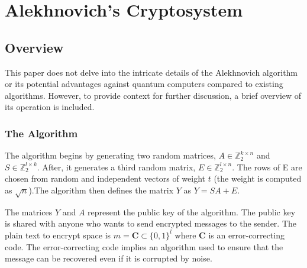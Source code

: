 \chapter{Alekhnovich's Cryptosystem}

\section{Overview}
This paper does not delve into the intricate details of the Alekhnovich algorithm or its potential advantages against quantum computers compared to existing algorithms. However, to provide context for further discussion, a brief overview of its operation is included.

\subsection{The Algorithm} The algorithm begins by generating two random matrices, $A\in \mathbb{Z}^{k\times n}_2$ and $S\in \mathbb{Z}^{l\times k}_2$. After, it generates a third random matrix, $E\in \mathbb{Z}^{l\times n}_2$. The rows of E are chosen from random and independent vectors of weight $t$ (the weight is computed as $\sqrt{n}$).The algorithm then defines the matrix $Y$ as $Y = SA + E$.

The matrices $Y$ and $A$  represent the public key of the algorithm. The public key is shared with anyone who wants to send encrypted messages to the sender.
The plain text to encrypt space is $m = \mathbf{C} \subset \{0,1\}^l $ 
where $\mathbf{C}$ is an error-correcting code. The error-correcting code 
implies an algorithm used to ensure that the message can be recovered even if 
it is corrupted by noise.

